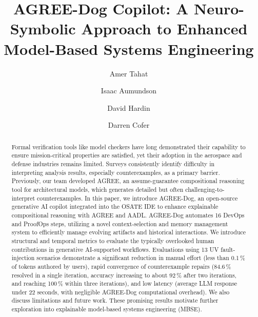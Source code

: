\documentclass{llncs}
\begin{document}
%
\title{AGREE-Dog Copilot: A Neuro-Symbolic Approach to Enhanced Model-Based Systems Engineering}%
%
%
\author{Amer Tahat\and
  Isaac Aumundson \and
  David Hardin \and
  Darren Cofer}
%
%
%

\maketitle

\begin{abstract}
Formal verification tools like model checkers have long demonstrated their capability to ensure mission-critical properties are satisfied, yet their adoption in the aerospace and defense industries remains limited. Surveys consistently identify difficulty in interpreting analysis results, especially counterexamples, as a primary barrier. Previously, our team developed AGREE, an assume-guarantee compositional reasoning tool for architectural models, which generates detailed but often challenging-to-interpret counterexamples.
%
In this paper, we introduce AGREE-Dog, an open-source generative AI copilot integrated into the OSATE IDE to enhance explainable compositional reasoning with AGREE and AADL. AGREE-Dog automates 16 DevOps and ProofOps steps, utilizing a novel context-selection and memory management system to efficiently manage evolving artifacts and historical interactions.
%
We introduce structural and temporal metrics to evaluate the typically overlooked human contributions in generative AI-supported workflows. Evaluations using 13 UV fault-injection scenarios demonstrate a significant reduction in manual effort (less than 0.1\,\% of tokens authored by users), rapid convergence of counterexample repairs (84.6\,\% resolved in a single iteration, accuracy increasing to about 92\,\% after two iterations, and reaching 100\,\% within three iterations), and low latency (average LLM response under 22 seconds, with negligible AGREE-Dog computational overhead). We also discuss limitations and future work. These promising results motivate further exploration into explainable model-based systems engineering (MBSE).
\end{abstract}
\end{document}

